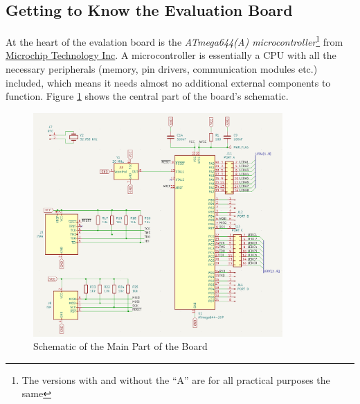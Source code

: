 \documentclass{article}
\begin{document}
\subsection{Getting to Know the Evaluation Board}\label{sec:boardOverview}
At the heart of the evalation board is the \emph{ATmega644(A) microcontroller}\footnote{The versions with and without the ``A'' are for all practical purposes the same} from \href{https://www.microchip.com/}{Microchip Technology Inc}. A microcontroller is essentially a CPU with all the necessary peripherals (memory, pin drivers, communication modules etc.) included, which means it needs almost no additional external components to function. Figure \ref{fig:schematicATmega} shows the central part of the board's schematic. 
\begin{figure}[htb]
\centering
\includegraphics[width=0.85\textwidth]{Pictures/SchematicATmega.png}
\caption{Schematic of the Main Part of the Board}
\label{fig:schematicATmega}
\end{figure}
\end{document}
